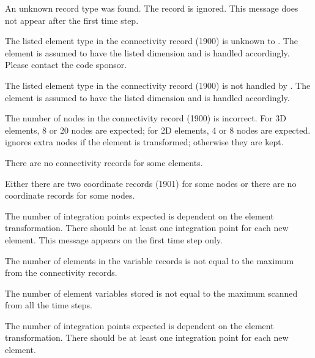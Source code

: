 {
An unknown record type was found. The record is ignored. This message
does not appear after the first time step.
}

{
The listed element type in the connectivity record (1900) is unknown to
\caps{\PROGRAM}. The element is assumed to have the listed dimension and
is handled accordingly. Please contact the code sponsor.
}

{
The listed element type in the connectivity record (1900) is not handled
by \caps{\PROGRAM}. The element is assumed to have the listed dimension
and is handled accordingly.
}

{
The number of nodes in the connectivity record (1900) is incorrect. For
3D elements, 8 or 20 nodes are expected; for 2D elements, 4 or 8 nodes
are expected. \caps{\PROGRAM} ignores extra nodes if the element is
transformed; otherwise they are kept.
}

{
There are no connectivity records for some elements.
}

{
Either there are two coordinate records (1901) for some nodes or there
are no coordinate records for some nodes.
}

{
The number of integration points expected is dependent on the element
transformation. There should be at least one integration point for each
new element. This message appears on the first time step only.
}

{
The number of elements in the variable records is not equal to the
maximum from the connectivity records.
}

{
The number of element variables stored is not equal to the maximum
scanned from all the time steps.
}

{
The number of integration points expected is dependent on the element
transformation. There should be at least one integration point for each
new element.
}

